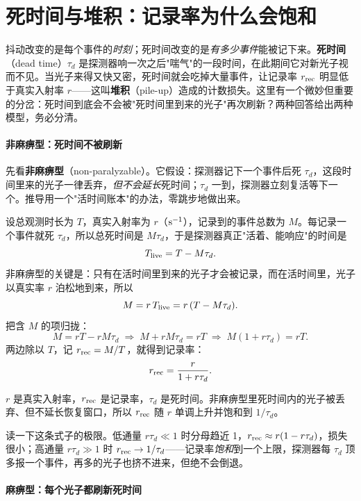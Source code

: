 \section{死时间与堆积：记录率为什么会饱和}
\label{sec:e13-deadtime}

抖动改变的是每个事件的\emph{时刻}；死时间改变的是\emph{有多少事件}能被记下来。\textbf{死时间}（dead time）\(\tau_d\) 是探测器响一次之后"喘气"的一段时间，在此期间它对新光子视而不见。当光子来得又快又密，死时间就会吃掉大量事件，让记录率 \(r_{\rm rec}\) 明显低于真实入射率 \(r\)——这叫\textbf{堆积}（pile-up）造成的计数损失。这里有一个微妙但重要的分岔：死时间到底会不会被"死时间里到来的光子"再次刷新？两种回答给出两种模型，务必分清。

\paragraph{非麻痹型：死时间不被刷新}

先看\textbf{非麻痹型}（non-paralyzable）。它假设：探测器记下一个事件后死 \(\tau_d\)，这段时间里来的光子一律丢弃，\emph{但不会延长}死时间；\(\tau_d\) 一到，探测器立刻复活等下一个。推导用一个"活时间账本"的办法，零跳步地做出来。

设总观测时长为 \(T\)，真实入射率为 \(r\)（\({\rm s}^{-1}\)），记录到的事件总数为 \(M\)。每记录一个事件就死 \(\tau_d\)，所以总死时间是 \(M\tau_d\)，于是探测器真正"活着、能响应"的时间是
\[
  T_{\rm live}=T-M\tau_d .
\]
非麻痹型的关键是：只有在活时间里到来的光子才会被记录，而在活时间里，光子以真实率 \(r\) 泊松地到来，所以
\[
  M=r\,T_{\rm live}=r\,(T-M\tau_d).
\]
把含 \(M\) 的项归拢：
\[
  M=rT-rM\tau_d \;\Longrightarrow\; M+rM\tau_d=rT \;\Longrightarrow\; M(1+r\tau_d)=rT .
\]
两边除以 \(T\)，记 \(r_{\rm rec}=M/T\)，就得到记录率：
\begin{equation}
  r_{\rm rec}=\frac{r}{1+r\tau_d}.
  \label{eq:e13-nonparalyzable}
\end{equation}
\begin{formulaexplain}
\(r\) 是真实入射率，\(r_{\rm rec}\) 是记录率，\(\tau_d\) 是死时间。非麻痹型里死时间内的光子被丢弃、但不延长恢复窗口，所以 \(r_{\rm rec}\) 随 \(r\) 单调上升并饱和到 \(1/\tau_d\)。
\end{formulaexplain}
读一下这条式子的极限。低通量 \(r\tau_d\ll1\) 时分母趋近 1，\(r_{\rm rec}\approx r(1-r\tau_d)\)，损失很小；高通量 \(r\tau_d\gg1\) 时 \(r_{\rm rec}\to 1/\tau_d\)——记录率\emph{饱和}到一个上限，探测器每 \(\tau_d\) 顶多报一个事件，再多的光子也挤不进来，但绝不会倒退。

\paragraph{麻痹型：每个光子都刷新死时间}

